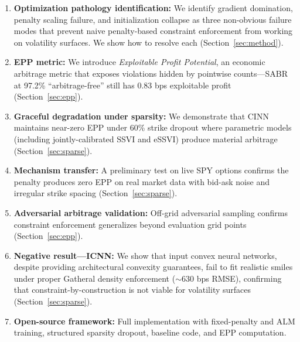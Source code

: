 \documentclass[11pt,a4paper]{article}
\begin{document}
\begin{enumerate}[leftmargin=*]
    \item \textbf{Optimization pathology identification:} We identify gradient domination, penalty scaling failure, and initialization collapse as three non-obvious failure modes that prevent naive penalty-based constraint enforcement from working on volatility surfaces. We show how to resolve each (Section~\ref{sec:method}).

    \item \textbf{EPP metric:} We introduce \textit{Exploitable Profit Potential}, an economic arbitrage metric that exposes violations hidden by pointwise counts---SABR at 97.2\% ``arbitrage-free'' still has 0.83 bps exploitable profit (Section~\ref{sec:epp}).

    \item \textbf{Graceful degradation under sparsity:} We demonstrate that CINN maintains near-zero EPP under 60\% strike dropout where parametric models (including jointly-calibrated SSVI and eSSVI) produce material arbitrage (Section~\ref{sec:sparse}).

    \item \textbf{Mechanism transfer:} A preliminary test on live SPY options confirms the penalty produces zero EPP on real market data with bid-ask noise and irregular strike spacing (Section~\ref{sec:sparse}).

    \item \textbf{Adversarial arbitrage validation:} Off-grid adversarial sampling confirms constraint enforcement generalizes beyond evaluation grid points (Section~\ref{sec:epp}).

    \item \textbf{Negative result---ICNN:} We show that input convex neural networks, despite providing architectural convexity guarantees, fail to fit realistic smiles under proper Gatheral density enforcement (${\sim}$630 bps RMSE), confirming that constraint-by-construction is not viable for volatility surfaces (Section~\ref{sec:sparse}).

    \item \textbf{Open-source framework:} Full implementation with fixed-penalty and ALM training, structured sparsity dropout, baseline code, and EPP computation.
\end{enumerate}
\end{document}
